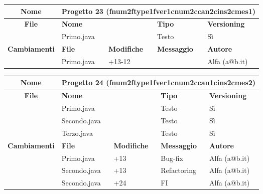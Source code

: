 \begin{table}[ht]
\footnotesize
\begin{tabular}{|c|p{2.5cm}|p{2cm}|p{2.5cm}|p{2.5cm}|}
  \hline
  \textbf{Nome}	& \multicolumn{4}{l|}{Progetto 23 (fnum2ftype1fver1cnum2ccan2cins2cmes1)} 								\\
  \hline
  \rowcolor{lightgray}\textbf{File} 		& \multicolumn{2}{l|}{\textbf{Nome}}		& \textbf{Tipo}		& \textbf{Versioning} 		\\
						\cline{2-5}
						& \multicolumn{2}{l|}{Primo.java}		& Testo			& Sì				\\
  \hline
  \rowcolor{lightgray}\textbf{Cambiamenti}	& \textbf{File}		&\textbf{Modifiche}	& \textbf{Messaggio}	& \textbf{Autore}		\\
						\cline{2-5}
						& Primo.java		& +13-12 		& 			& Alfa (a@b.it)			\\
						
  \hline
\end{tabular}
\end{table}




\begin{table}[ht]
\footnotesize
\begin{tabular}{|c|p{2.5cm}|p{2cm}|p{2.5cm}|p{2.5cm}|}
  \hline
  \textbf{Nome}	& \multicolumn{4}{l|}{Progetto 24 (fnum2ftype1fver1cnum2ccan1cins2cmes2)} 								\\
  \hline
  \rowcolor{lightgray}\textbf{File} 		& \multicolumn{2}{l|}{\textbf{Nome}}		& \textbf{Tipo}		& \textbf{Versioning} 		\\
						\cline{2-5}
						& \multicolumn{2}{l|}{Primo.java}		& Testo			& Sì				\\
						\cline{2-5}
						& \multicolumn{2}{l|}{Secondo.java}		& Testo			& Sì				\\
						\cline{2-5}
						& \multicolumn{2}{l|}{Terzo.java}		& Testo			& Sì				\\
  \hline
  \rowcolor{lightgray}\textbf{Cambiamenti}	& \textbf{File}		&\textbf{Modifiche}	& \textbf{Messaggio}	& \textbf{Autore}		\\
						\cline{2-5}
						& Primo.java		& +13	 		& Bug-fix		& Alfa (a@b.it)			\\
						\cline{2-5}
						& Secondo.java		& +13	 		& Refactoring		& Alfa (a@b.it)			\\
						\cline{2-5}
						& Secondo.java		& +24	 		& FI			& Alfa (a@b.it)			\\
  \hline
\end{tabular}
\end{table}

